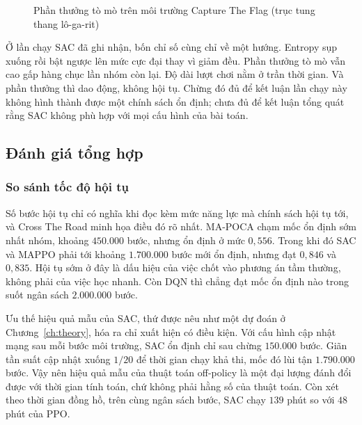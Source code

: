 \begin{figure}[H]
    \caption{Phần thưởng tò mò trên môi trường Capture The Flag (trục tung thang
    lô-ga-rit)}
    \label{fig:ctf_curiosity}
\end{figure}

\indent Ở lần chạy SAC đã ghi nhận, bốn chỉ số cùng chỉ về một hướng. Entropy sụp xuống rồi
bật ngược lên mức cực đại thay vì giảm đều. Phần thưởng tò mò vẫn cao gấp hàng chục lần
nhóm còn lại. Độ dài lượt chơi nằm ở trần thời gian. Và phần thưởng thì dao động, không
hội tụ. Chừng đó đủ để kết luận lần chạy này không hình thành được một chính sách ổn định;
chưa đủ để kết luận tổng quát rằng SAC không phù hợp với mọi cấu hình của bài toán.

\subsection{Đánh giá tổng hợp}

\subsubsection{So sánh tốc độ hội tụ}
\indent Số bước hội tụ chỉ có nghĩa khi đọc kèm mức năng lực mà chính sách hội tụ tới, và
Cross The Road minh họa điều đó rõ nhất. MA-POCA chạm mốc ổn định sớm nhất nhóm, khoảng
$450.000$ bước, nhưng ổn định ở mức $0{,}556$. Trong khi đó SAC và MAPPO phải tới khoảng
$1.700.000$ bước mới ổn định, nhưng đạt $0{,}846$ và
$0{,}835$. Hội tụ sớm ở đây là dấu hiệu của việc chốt vào phương án tầm thường, không phải
của việc học nhanh. Còn DQN thì chẳng đạt mốc ổn định nào trong suốt ngân sách $2.000.000$ bước.

\indent Ưu thế hiệu quả mẫu của SAC, thứ được nêu như một dự đoán ở
Chương~\ref{ch:theory}, hóa ra chỉ xuất hiện có điều kiện. Với cấu hình cập nhật mạng sau
mỗi bước môi trường, SAC ổn định chỉ
sau chừng $150.000$ bước. Giãn tần suất cập nhật xuống $1/20$ để thời gian chạy khả thi, mốc đó
lùi tận $1.790.000$ bước. Vậy nên
hiệu quả mẫu của thuật toán off-policy là một đại lượng đánh đổi được với thời gian tính
toán, chứ không phải hằng số của thuật toán. Còn xét theo thời gian đồng hồ, trên cùng
ngân sách bước, SAC chạy $139$ phút so với $48$ phút của PPO.

